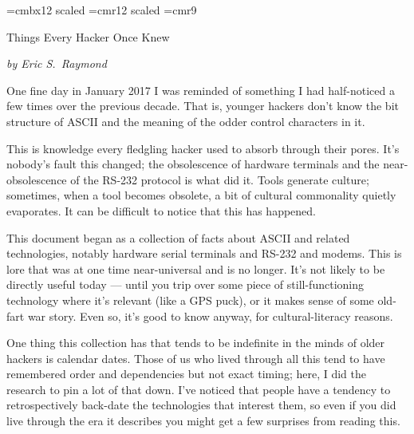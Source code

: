 \font\biggerbold=cmbx12 scaled %
\font\biggertxt=cmr12 scaled %
\font\ninerm=cmr9
\let\mc=\ninerm %
\def\acro#1{{\mc #1\spacefactor1000}}%
\def\CEE/{\acro C}%
\def\UNIX/{{\mc U\kern-.05emNIX\spacefactor1000}}%
\def\ASCII/{\acro{ASCII}}%
\def\RSTTT/{\acro{RS-232}}%
\def\title#1{\leavevmode\vskip 0.5in\centerline{\biggertxt #1}\par}%
\def\subtitle#1{\medskip\centerline{\sl #1}}%
\def\sect#1.{\vskip 0.5in plus 0.1in minus 0.1in\goodbreak\noindent{\biggerbold #1}\par\noindent\ignorespaces}%
\def\dlist#1.{\vskip0.7ex plus 0.05ex minus 0.05ex\goodbreak\noindent\hangindent=2em\hangafter=1\line{#1\hfil}}%
%
%
%
\title{Things Every Hacker Once Knew}
\subtitle{by Eric S.~Raymond}
\vskip 0.5in
\noindent One fine day in January 2017 I was reminded of something I had half-noticed a
few times over the previous decade. That is, younger hackers don't know the bit
structure of \ASCII/ and the meaning of the odder control characters in it.

This is knowledge every fledgling hacker used to absorb through their pores.
It's nobody's fault this changed; the obsolescence of hardware terminals and
the near-obsolescence of the \RSTTT/ protocol is what did it. Tools generate
culture; sometimes, when a tool becomes obsolete, a bit of cultural commonality
quietly evaporates. It can be difficult to notice that this has happened.

This document began as a collection of facts about \ASCII/ and related
technologies, notably hardware serial terminals and \RSTTT/ and modems. This is
lore that was at one time near-universal and is no longer. It's not likely to
be directly useful today  ---  until you trip over some piece of still-functioning
technology where it's relevant (like a \acro{GPS} puck), or it makes sense of some
old-fart war story. Even so, it's good to know anyway, for cultural-literacy
reasons.

One thing this collection has that tends to be indefinite in the minds of older
hackers is calendar dates. Those of us who lived through all this tend to have
remembered order and dependencies but not exact timing; here, I did the
research to pin a lot of that down. I've noticed that people have a tendency to
retrospectively back-date the technologies that interest them, so even if you
did live through the era it describes you might get a few surprises from
reading this.

